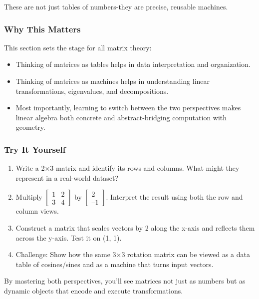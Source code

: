 \documentclass[
  letterpaper,
  DIV=11,
  numbers=noendperiod]{scrreprt}
\providecommand{\tightlist}{%
  \setlength{\itemsep}{0pt}\setlength{\parskip}{0pt}}
\begin{document}
These are not just tables of numbers-they are precise, reusable
machines.

\subsubsection{Why This Matters}\label{why-this-matters}

This section sets the stage for all matrix theory:

\begin{itemize}
\tightlist
\item
  Thinking of matrices as tables helps in data interpretation and
  organization.
\item
  Thinking of matrices as machines helps in understanding linear
  transformations, eigenvalues, and decompositions.
\item
  Most importantly, learning to switch between the two perspectives
  makes linear algebra both concrete and abstract-bridging computation
  with geometry.
\end{itemize}

\subsubsection{Try It Yourself}\label{try-it-yourself-10}

\begin{enumerate}
\def\labelenumi{\arabic{enumi}.}
\tightlist
\item
  Write a 2×3 matrix and identify its rows and columns. What might they
  represent in a real-world dataset?
\item
  Multiply \(\begin{bmatrix} 1 & 2 \\ 3 & 4 \end{bmatrix}\) by
  \(\begin{bmatrix} 2 \\ –1 \end{bmatrix}\). Interpret the result using
  both the row and column views.
\item
  Construct a matrix that scales vectors by 2 along the x-axis and
  reflects them across the y-axis. Test it on (1, 1).
\item
  Challenge: Show how the same 3×3 rotation matrix can be viewed as a
  data table of cosines/sines and as a machine that turns input vectors.
\end{enumerate}

By mastering both perspectives, you'll see matrices not just as numbers
but as dynamic objects that encode and execute transformations.
\end{document}
